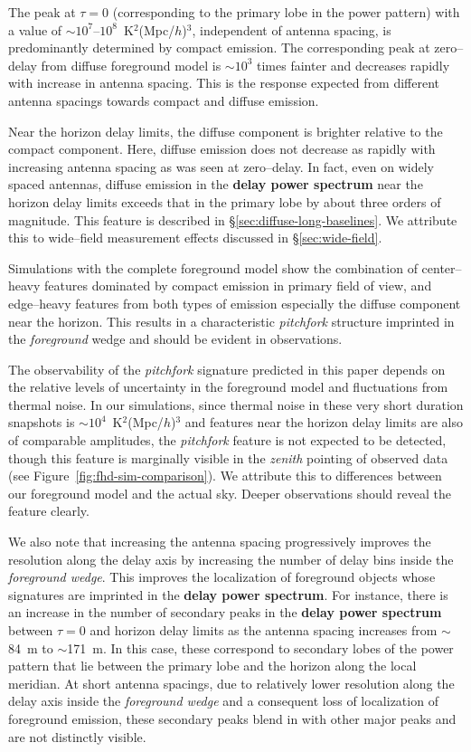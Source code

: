 \documentclass[preprint2,iop,numberedappendix]{emulateapj}
\begin{document}
The peak at $\tau=0$ (corresponding to the primary lobe in the power pattern) with a value of $\sim 10^7$--$10^8$~K$^2$(Mpc/$h$)$^3$, independent of antenna spacing, is predominantly determined by compact emission. The corresponding peak at zero--delay from diffuse foreground model is $\sim 10^3$ times fainter and decreases rapidly with increase in antenna spacing. This is the response expected from different antenna spacings towards compact and diffuse emission. 

Near the horizon delay limits, the diffuse component is brighter relative to the compact component. Here, diffuse emission does not decrease as rapidly with increasing antenna spacing as was seen at zero--delay. In fact, even on widely spaced antennas, diffuse emission in the {\bf delay power spectrum} near the horizon delay limits exceeds that in the primary lobe by about three orders of magnitude. This feature is described in \S\ref{sec:diffuse-long-baselines}. We attribute this to wide--field measurement effects discussed in \S\ref{sec:wide-field}. 

Simulations with the complete foreground model show the combination of center--heavy features dominated by compact emission in primary field of view, and edge--heavy features from both types of emission especially the diffuse component near the horizon. This results in a characteristic {\it pitchfork} structure imprinted in the {\it foreground} wedge and should be evident in observations.

The observability of the {\it pitchfork} signature predicted in this paper depends on the relative levels of uncertainty in the foreground model and fluctuations from thermal noise. In our simulations, since thermal noise in these very short duration snapshots is $\sim 10^4$~K$^2$(Mpc/$h$)$^3$ and features near the horizon delay limits are also of comparable amplitudes, the {\it pitchfork} feature is not expected to be detected, though this feature is marginally visible in the {\it zenith} pointing of observed data (see Figure~\ref{fig:fhd-sim-comparison}). We attribute this to differences between our foreground model and the actual sky.  Deeper observations should reveal the feature clearly.

We also note that increasing the antenna spacing progressively improves the resolution along the delay axis by increasing the number of delay bins inside the {\it foreground wedge}. This improves the localization of foreground objects whose signatures are imprinted in the {\bf delay power spectrum}. For instance, there is an increase in the number of secondary peaks in the {\bf delay power spectrum} between $\tau=0$ and horizon delay limits as the antenna spacing increases from $\sim$84~m to $\sim$171~m. In this case, these correspond to secondary lobes of the power pattern that lie between the primary lobe and the horizon along the local meridian. At short antenna spacings, due to relatively lower resolution along the delay axis inside the {\it foreground wedge} and a consequent loss of localization of foreground emission, these secondary peaks blend in with other major peaks and are not distinctly visible. 
\end{document}
